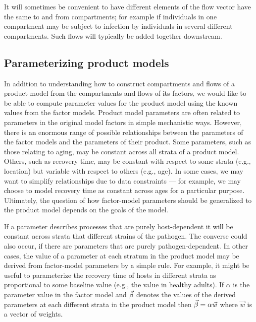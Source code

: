 It will sometimes be convenient to have different elements of the flow vector have the same to and from compartments; for example if individuals in one compartment may be subject to infection by individuals in several different compartments. Such flows will typically be added together downstream.



\subsection{Parameterizing product models}

In addition to understanding how to construct compartments and flows of a product model from the compartments and flows of its factors, we would like to be able to compute parameter values for the product model using the known values from the factor models.
Product model parameters are often related to parameters in the original model factors in simple mechanistic ways. However, there is an enormous range of possible relationships between the parameters of the factor models and the parameters of their product.
Some parameters, such as those relating to aging, may be constant across all strata of a product model. Others, such as recovery time, may be constant with respect to some strata (e.g., location) but variable with respect to others (e.g., age). In some cases, we may want to simplify relationships due to data constraints --- for example, we may choose to model recovery time as constant across ages for a particular purpose. Ultimately, the question of how factor-model parameters should be generalized to the product model depends on the goals of the model. 

If a parameter describes processes that are purely host-dependent it will be constant across strata that different strains of the pathogen. The converse could also occur, if there are parameters that are purely pathogen-dependent. 
In other cases, the value of a parameter at each stratum in the product model may be derived from factor-model parameters by a simple rule. For example, it might be useful to parameterize the recovery time of hosts in different strata as proportional to some baseline value (e.g., the value in healthy adults). If $\alpha$ is the parameter value in the factor model and $\vec{\beta}$ denotes the values of the derived parameters at each different strata in the product model then $\vec{\beta} = \alpha\vec{w}$ where $\vec{w}$ is a vector of weights.

